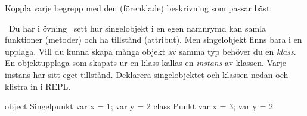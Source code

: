 

\ifPreSolution

\Exercise{\ExeWeekFIVE}\label{exe:W05}

\begin{Goals}

\end{Goals}

\begin{Preparations}
\item {}
\end{Preparations}

\else


\ExerciseSolution{\ExeWeekFIVE}


\fi


\BasicTasks %



\QUESTBEGIN

\Task \what

\vspace{1em}\noindent Koppla varje begrepp med den (förenklade) beskrivning som passar bäst:

\begin{ConceptConnections}

\end{ConceptConnections}

\SOLUTION

\TaskSolved \what

\begin{ConceptConnections}

\end{ConceptConnections}

\QUESTEND




\QUESTBEGIN

\Task \what~Du har i övning \texttt{\ExeWeekFOUR}~sett hur singelobjekt i en egen namnrymd  kan samla funktioner (metoder) och ha tillstånd (attribut). Men singelobjekt finns bara i en upplaga.
Vill du kunna skapa många objekt av samma typ behöver du en \emph{klass}. En objektupplaga som skapats ur en klass kallas en \emph{instans} av klassen. Varje instans har sitt eget tillstånd.
Deklarera singelobjektet och klassen nedan och klistra in i REPL.

\begin{Code}
object Singelpunkt { var x = 1; var y = 2 }
class  Punkt       { var x = 3; var y = 2 }
\end{Code}

